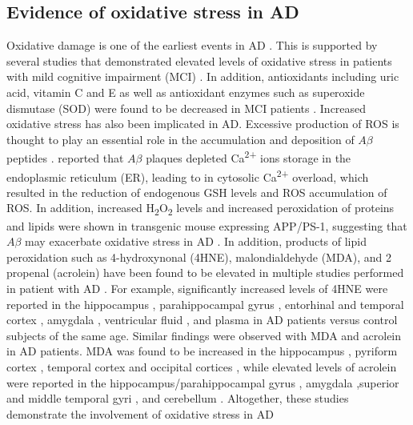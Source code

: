 \subsection{Evidence of oxidative stress in AD}
Oxidative damage is one of the earliest events in AD \citep{Nunomura2001}. This is supported by several studies that demonstrated elevated levels of oxidative stress in patients with mild cognitive impairment (MCI) \citep{Ansari2010,Pratico2004,Williams2006}. In addition, antioxidants including uric acid, vitamin C and E as well as antioxidant enzymes such as superoxide dismutase (SOD) were found to be decreased in MCI patients \citep{Rinaldi2003,Torres2011}. Increased oxidative stress has also been implicated in AD. Excessive production of ROS is thought to play an essential role in the accumulation and deposition of $A\beta$ peptides \citep{Bonda2010}. \citet{Ferreiro2008} reported that $A\beta$ plaques depleted Ca\textsuperscript{2+} ions storage in the endoplasmic reticulum (ER), leading to in cytosolic Ca\textsuperscript{2+} overload, which resulted in the reduction of endogenous GSH levels and ROS accumulation of ROS. In addition, increased H\textsubscript{2}O\textsubscript{2} levels and increased peroxidation of proteins and lipids were shown in transgenic mouse expressing APP/PS-1, suggesting that $A\beta$ may exacerbate oxidative stress in AD \citep{Matsuoka2001,Zhao2013}. In addition, products of lipid peroxidation such as 4-hydroxynonal (4HNE), malondialdehyde (MDA), and 2 propenal (acrolein) have been found to be elevated in multiple studies performed in patient with AD \citep{Wang2014,Zhao2013}. For example, significantly increased levels of 4HNE were reported in the hippocampus \citep{Lovell1995,Markesbery1998,Montine1998}, parahippocampal gyrus \citep{Markesbery1998}, entorhinal and temporal cortex \citep{Montine1998}, amygdala \citep{Lovell1995,Markesbery1998}, ventricular fluid \citep{Lovell1997}, and plasma \citep{McGrath2001} in AD patients versus control subjects of the same age. Similar findings were observed with MDA and acrolein in AD patients. MDA was found to be increased in the hippocampus \citep{Lovell1995}, pyriform cortex \citep{Lovell1995}, temporal cortex \citep{Marcus1998,Palmer1994} and occipital cortices \citep{Miranda2000}, while elevated levels of acrolein were reported in the hippocampus/parahippocampal gyrus \citep{Bradley2010,Calingasan1999,Lovell2001,Williams2006}, amygdala \citep{Lovell2001},superior and middle temporal gyri \citep{Bradley2010,Williams2006}, and cerebellum \citep{Bradley2010,Williams2006}. Altogether, these studies demonstrate the involvement of oxidative stress in AD


